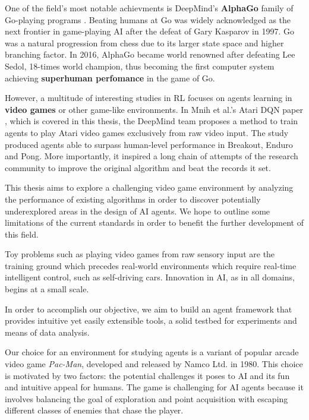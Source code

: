 \documentclass[12pt,twoside]{report}
\begin{document}
One of the field's most notable achievments is DeepMind's \textbf{AlphaGo} family of Go-playing programs \cite{ago, alpha-zero}.
Beating humans at Go was widely acknowledged as the next frontier in game-playing AI after the defeat of Gary Kasparov in 1997\footnotemark.
Go was a natural progression from chess due to its larger state space and higher branching factor.
In 2016, AlphaGo became world renowned after defeating Lee Sedol, 18-times world champion, thus becoming the first computer system achieving \textbf{superhuman perfomance} in the game of Go.

However, a multitude of interesting studies in RL focuses on agents learning in \textbf{video games} or other game-like environments.
In Mnih et al.'s Atari DQN paper \cite{atari-dqn}, which is covered in this thesis, the DeepMind team proposes a method to train agents to play Atari video games exclusively from raw video input.
The study produced agents able to surpass human-level performance in Breakout, Enduro and Pong.
More importantly, it inspired a long chain of attempts of the research community to improve the original algorithm and beat the records it set.

This thesis aims to explore a challenging video game environment by analyzing the performance of existing algorithms in order to discover potentially underexplored areas in the design of AI agents.
We hope to outline some limitations of the current standards in order to benefit the further development of this field.

Toy problems such as playing video games from raw sensory input are the training ground which precedes real-world environments which require real-time intelligent control, such as self-driving cars.
Innovation in AI, as in all domains, begins at a small scale.

In order to accomplish our objective, we aim to build an agent framework that provides intuitive yet easily extensible tools, a solid testbed for experiments and means of data analysis.

Our choice for an environment for studying agents is a variant of popular arcade video game \emph{Pac-Man}, developed and released by Namco Ltd. in 1980.
This choice is motivated by two factors: the potential challenges it poses to AI and its fun and intuitive appeal for humans.
The game is challenging for AI agents because it involves balancing the goal of exploration and point acquisition with escaping different classes of enemies that chase the player.
\end{document}
